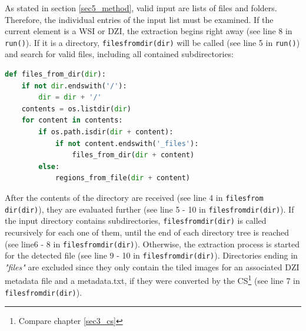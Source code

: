 As stated in section \ref{sec5_method}, valid input are lists of files and folders. Therefore, the individual entries of the input list must be examined. If the current element is a WSI or DZI, the extraction begins right away (see line 8 in \texttt{run()}). If it is a directory, \texttt{files{\textunderscore}from{\textunderscore}dir(dir)} will be called (see line 5 in \texttt{run()}) and search for valid files, including all contained subdirectories:

\begin{lstlisting}[frame=single, language=python, title=\texttt{files{\textunderscore}from{\textunderscore}dir(dir)} from TessellationService.py]
def files_from_dir(dir):
	if not dir.endswith('/'):
		dir = dir + '/'
	contents = os.listdir(dir)
	for content in contents:
		if os.path.isdir(dir + content):
			if not content.endswith('_files'):
				files_from_dir(dir + content)
		else:
			regions_from_file(dir + content)
\end{lstlisting}

After the contents of the directory are received (see line 4 in \texttt{files{\textunderscore}from{\textunderscore} dir(dir)}), they are evaluated further (see line 5 - 10 in \texttt{files{\textunderscore}from{\textunderscore}dir(dir)}). If the input directory contains subdirectories, \texttt{files{\textunderscore}from{\textunderscore}dir(dir)} is called recursively for each one of them, until the end of each directory tree is reached (see line6 - 8 in \texttt{files{\textunderscore}from{\textunderscore}dir(dir)}). Otherwise, the extraction process is started for the detected file (see line 9 - 10 in \texttt{files{\textunderscore}from{\textunderscore}dir(dir)}). Directories ending in \emph{"{\textunderscore}files"} are excluded since they only contain the tiled images for an associated DZI metadata file and a metadata.txt, if they were converted by the CS\footnote{
	Compare chapter \ref{sec3_cs}
} (see line 7 in \texttt{files{\textunderscore}from{\textunderscore}dir(dir)}).

